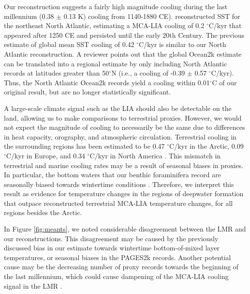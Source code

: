 \documentclass[draft]{agujournal2019}
\begin{document}
Our reconstruction suggests a fairly high magnitude cooling
during the last millennium (0.38 $\pm$ 0.13 K)
cooling from 1140-1880
CE).  reconstructed SST
for the northeast North Atlantic, estimating a
MCA-LIA cooling of $0.2$ $^{\circ}$C/kyr that appeared after 1250 CE and
persisted until the early 20th Century. The previous estimate of
global mean SST cooling of 0.42 $^{\circ}$C/kyr \cite{ocean2k} is similar
to our North Atlantic reconstruction.
A reviewer points out that the global Ocean2k estimate can be translated into a regional estimate
  by only including North Atlantic records at latitudes greater than 50$^{\circ}$N (i.e., a cooling
  of -0.39 $\pm$ 0.57 $^{\circ}$C/kyr). Thus, the North Atlantic Ocean2k records yield a cooling within
  0.01$^{\circ}$C of our original result, but are no longer statistically significant.


A large-scale climate signal
  such as the LIA should also be detectable on the land, allowing us to
  make comparisons to terrestrial proxies. However, we would not expect the
  magnitude of cooling to necessarily be the same due to differences in heat
  capacity, orography, and atmospheric circulation.
Terrestrial cooling in the
surrounding regions has been estimated to be 0.47 $^{\circ}$C/kyr in the
Arctic, 0.09 $^{\circ}$C/kyr in Europe, and 0.34 $^{\circ}$C/kyr in North
America \cite[]{Consortium--2013:Continental}. This mismatch in
terrestrial and marine cooling rates may be a result of seasonal
biases in proxies. In particular, the bottom waters that our benthic
foraminifera record are seasonally biased towards wintertime
conditions \cite[]{Stommel-1979:Determination,
  Williams-Marshall-1995:Does}. Therefore, we interpret this result as
evidence for temperature changes in the regions of deepwater formation
that outpace reconstructed terrestrial MCA-LIA temperature changes,
for all regions besides the Arctic.

In Figure \ref{fig:meants}, we noted considerable disagreement between
the LMR and our reconstructions. This disagreement may be caused
by the previously discussed bias in our estimate towards wintertime
bottom-of-mixed layer temperatures, or seasonal biases in the PAGES2k
records. Another potential cause may be the decreasing number of proxy
records towards the beginning of the last millennium, which could
cause dampening of the MCA-LIA cooling signal in the LMR
\cite{Wang-Emile-Geay-2014:Evaluating, Hakim-Emile-Geay-2016:last}.
\end{document}
